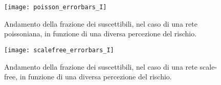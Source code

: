 \begin{figure}
		\begin{center}
			\texttt{[image: poisson\_errorbars\_I]}
			\caption{Andamento della frazione dei suscettibili, nel caso di una rete poissoniana, in funzione di una diversa percezione del rischio.}
			\label{fig:sim_poisson}
		\end{center}
\end{figure}

\begin{figure}
		\begin{center}
			\texttt{[image: scalefree\_errorbars\_I]}
			\caption{Andamento della frazione dei suscettibili, nel caso di una rete scale-free, in funzione di una diversa percezione del rischio.}
			\label{fig:sim_scalefree}
		\end{center}
\end{figure}	
	